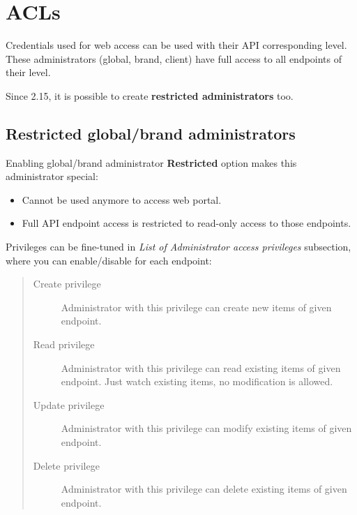 \documentclass[letterpaper,10pt,english]{sphinxmanual}
\begin{document}
\chapter{ACLs}
\label{api_rest/acls:acls}\label{api_rest/acls::doc}\label{api_rest/acls:id1}
Credentials used for web access can be used with their API corresponding level. These administrators (global, brand, client)
have full access to all endpoints of their level.

Since 2.15, it is possible to create \textbf{restricted administrators} too.


\section{Restricted global/brand administrators}
\label{api_rest/acls:restricted-global-brand-administrators}
Enabling global/brand administrator \textbf{Restricted} option makes this administrator special:
\begin{itemize}
\item {} 
Cannot be used anymore to access web portal.

\item {} 
Full API endpoint access is restricted to read-only access to those endpoints.

\end{itemize}

Privileges can be fine-tuned in \emph{List of Administrator access privileges} subsection, where you can enable/disable
for each endpoint:
\begin{quote}
\begin{description}
\item[{Create privilege}] \leavevmode
Administrator with this privilege can create new items of given endpoint.

\item[{Read privilege}] \leavevmode
Administrator with this privilege can read existing items of given endpoint. Just watch existing items, no
modification is allowed.

\item[{Update privilege}] \leavevmode
Administrator with this privilege can modify existing items of given endpoint.

\item[{Delete privilege}] \leavevmode
Administrator with this privilege can delete existing items of given endpoint.

\end{description}
\end{quote}
\end{document}

